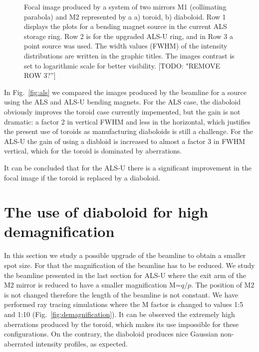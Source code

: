 \documentclass{iucr}              %
\newcommand{\todo}[1]{{\color{red}[TODO: "#1'']}}
\begin{document}
\begin{figure}
% 
\caption{Focal image produced by a system of two mirrors M1 (collimating parabola) and M2 represented by a a) toroid, b) diaboloid. Row 1 displays the plots for a bending magnet source in the current ALS storage ring. Row 2 is for the upgraded ALS-U ring, and in Row 3 a point source was used. The width values (FWHM) of the intensity distributions are written in the graphic titles. The images contrast is set to logarithmic scale for better visibility. \todo{REMOVE ROW 3?}
}
\end{figure}

In Fig.~\ref{fig:als} we compared the images produced by the beamline for a source using the ALS and ALS-U bending magnets. For the ALS case, the diaboloid obviously improves the toroid case currently impemented, but the gain is not dramatic: a factor 2 in vertical FWHM and less in the horizontal, which justifies the present use of toroids as manufacturing diaboloids is still a challenge. For the ALS-U the gain of using a diabloid is increased to almost a factor 3 in FWHM vertical, which for the toroid is dominated by aberrations.

It can be concluded that for the ALS-U there is a significant improvement in the focal image if the toroid is replaced by a diaboloid.
 

\section{The use of diaboloid for high demagnification}
\label{sec:scan}

In this section we study a possible upgrade of the beamline to obtain a smaller spot size. For that the magnification of the beamline has to be reduced. We study the beamline presented in the last section for ALS-U where the exit arm of the M2 mirror is reduced to have a smaller magnification M=$q/p$. The position of M2 is not changed therefore the length of the beamline is not constant. We have performed ray tracing simulations where the M factor is changed to values 1:5 and 1:10 (Fig.~\ref{fig:demagnification}). It can be observed the extremely high aberrations produced by the toroid, which makes its use impossible for these configurations. On the contrary, the diaboloid produces nice Gaussian non-aberrated intensity profiles, as expected.
\end{document}
